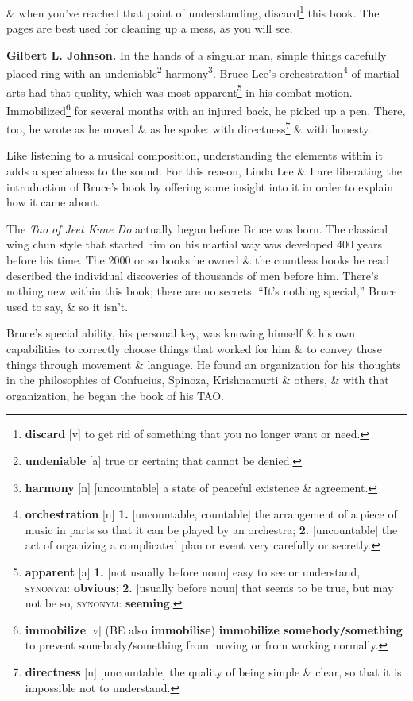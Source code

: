 \documentclass[oneside]{book}
\numberwithin{equation}{section}
\begin{document}
 \& when you've reached that point of understanding, discard\footnote{\textbf{discard} [v] to get rid of something that you no longer want or need.} this book. The pages are best used for cleaning up a mess, as you will see.

\textbf{Gilbert L. Johnson.} In the hands of a singular man, simple things carefully placed ring with an undeniable\footnote{\textbf{undeniable} [a] true or certain; that cannot be denied.} harmony\footnote{\textbf{harmony} [n] [uncountable] a state of peaceful existence \& agreement.}. Bruce Lee's orchestration\footnote{\textbf{orchestration} [n] \textbf{1.} [uncountable, countable] the arrangement of a piece of music in parts so that it can be played by an orchestra; \textbf{2.} [uncountable] the act of organizing a complicated plan or event very carefully or secretly.} of martial arts had that quality, which was most apparent\footnote{\textbf{apparent} [a] \textbf{1.} [not usually before noun] easy to see or understand, \textsc{synonym}: \textbf{obvious}; \textbf{2.} [usually before noun] that seems to be true, but may not be so, \textsc{synonym}: \textbf{seeming}.} in his combat motion. Immobilized\footnote{\textbf{immobilize} [v] (BE also \textbf{immobilise}) \textbf{immobilize somebody\texttt{/}something} to prevent somebody\texttt{/}something from moving or from working normally.} for several months with an injured back, he picked up a pen. There, too, he wrote as he moved \& as he spoke: with directness\footnote{\textbf{directness} [n] [uncountable] the quality of being simple \& clear, so that it is impossible not to understand.} \& with honesty.

Like listening to a musical composition, understanding the elements within it adds a specialness to the sound. For this reason, Linda Lee \& I are liberating the introduction of Bruce's book by offering some insight into it in order to explain how it came about.

The \textit{Tao of Jeet Kune Do} actually began before Bruce was born. The classical wing chun style that started him on his martial way was developed 400 years before his time. The 2000 or so books he owned \& the countless books he read described the individual discoveries of thousands of men before him. There's nothing new within this book; there are no secrets. ``It's nothing special,'' Bruce used to say, \& so it isn't.

Bruce's special ability, his personal key, was knowing himself \& his own capabilities to correctly choose things that worked for him \& to convey those things through movement \& language. He found an organization for his thoughts in the philosophies of Confucius, Spinoza, Krishnamurti \& others, \& with that organization, he began the book of his TAO.
\end{document}
